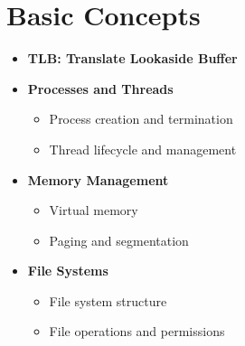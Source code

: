 \documentclass{article}
\begin{document}
\section{Basic Concepts}
\begin{itemize}
	\item \textbf{TLB: Translate Lookaside Buffer}
	\item \textbf{Processes and Threads}
	      \begin{itemize}
		      \item Process creation and termination
		      \item Thread lifecycle and management
	      \end{itemize}
	\item \textbf{Memory Management}
	      \begin{itemize}
		      \item Virtual memory
		      \item Paging and segmentation
	      \end{itemize}
	\item \textbf{File Systems}
	      \begin{itemize}
		      \item File system structure
		      \item File operations and permissions
	      \end{itemize}
\end{itemize}
\end{document}
